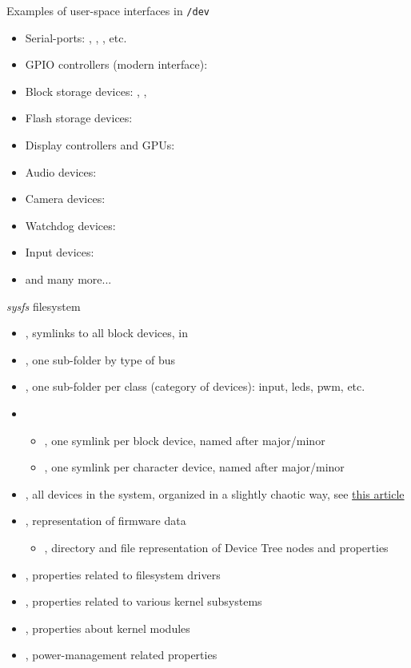 \begin{frame}{Examples of user-space interfaces in {\tt /dev}}
  \begin{itemize}
  \item Serial-ports: , ,
    , etc.
  \item GPIO controllers (modern interface): 
  \item Block storage devices: , , 
  \item Flash storage devices: 
  \item Display controllers and GPUs: 
  \item Audio devices: 
  \item Camera devices: 
  \item Watchdog devices: 
  \item Input devices: 
  \item and many more...
  \end{itemize}
\end{frame}

\begin{frame}{{\em sysfs} filesystem}
  \begin{itemize}
  \item {}, symlinks to all block devices, in
  \item {}, one sub-folder by type of bus
  \item {}, one sub-folder per class (category of devices):
    input, leds, pwm, etc.
  \item {}
    \begin{itemize}
    \item {}, one symlink per block device, named after
      major/minor
    \item {}, one symlink per character device, named after
      major/minor
    \end{itemize}
  \item {}, all devices in the system, organized in a
    slightly chaotic way, see \href{https://lwn.net/Articles/646617/}{this article}
  \item {}, representation of firmware data
    \begin{itemize}
    \item {}, directory and file representation of
      Device Tree nodes and properties
    \end{itemize}
  \item {}, properties related to filesystem drivers
  \item {}, properties related to various kernel subsystems
  \item {}, properties about kernel modules
  \item {}, power-management related properties
  \end{itemize}
\end{frame}

